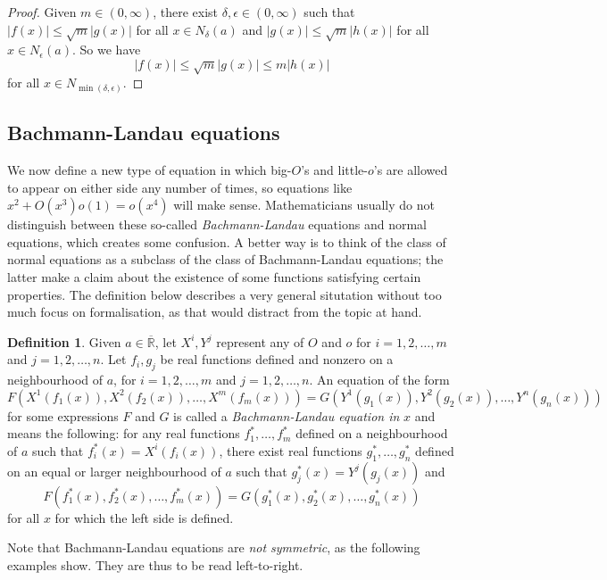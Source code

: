 \documentclass{article}
\theoremstyle{definition}
\newtheorem{definition}{Definition}
\newcommand\RRE{\overline{\mathbb R}}
\newcommand\abs[1]{\left\lvert#1\right\rvert}
\begin{document}
\begin{proof}
    Given \(m\in(0,\infty)\), there exist \(\delta,\epsilon\in(0,\infty)\) such that \(\abs{f(x)}\le\sqrt m \abs{g(x)}\) for all \(x\in N_{\delta}(a)\) and \(\abs{g(x)}\le\sqrt m \abs{h(x)}\) for all \(x\in N_{\epsilon}(a)\).
    So we have
    \[\abs{f(x)} \le \sqrt m \abs{g(x)} \le m \abs{h(x)}\]
    for all \(x\in N_{\min(\delta,\epsilon)}\).
\end{proof}

\subsection{Bachmann-Landau equations}\label{ssec:equations}

We now define a new type of equation in which big-$O$'s and little-$o$'s are allowed to appear on either side any number of times, so equations like $x^2 + O(x^3)o(1) = o(x^4)$ will make sense.
Mathematicians usually do not distinguish between these so-called \textit{Bachmann-Landau} equations and normal equations, which creates some confusion.
A better way is to think of the class of normal equations as a subclass of the class of Bachmann-Landau equations; the latter make a claim about the existence of some functions satisfying certain properties.
The definition below describes a very general situtation without too much focus on formalisation, as that would distract from the topic at hand.

\begin{definition}
    Given \(a\in\RRE\), let \(X^i, Y^j\) represent any of \(O\) and \(o\) for \(i=1,2,\ldots,m\) and \(j=1,2,\ldots,n\).
    Let \(f_i, g_j\) be real functions defined and nonzero on a neighbourhood of \(a\), for \(i=1,2,\ldots,m\) and \(j=1,2,\ldots,n\).
    An equation of the form
    \[F(X^1(f_1(x)), X^2(f_2(x)), \ldots, X^m(f_m(x))) = G(Y^1(g_1(x)), Y^2(g_2(x)), \ldots, Y^n(g_n(x)))\]
    for some expressions \(F\) and \(G\) is called a \textit{Bachmann-Landau equation in} \(x\) and means the following: for any real functions \(f_1^*, \ldots, f_m^*\) defined on a neighbourhood of \(a\) such that \(f_i^*(x) = X^i(f_i(x))\), there exist real functions \(g_1^*, \ldots, g_n^*\) defined on an equal or larger neighbourhood of \(a\) such that \(g_j^*(x) = Y^j(g_j(x))\) and
    \[F(f_1^*(x), f_2^*(x), \ldots, f_m^*(x)) = G(g_1^*(x), g_2^*(x), \ldots, g_n^*(x))\]
    for all \(x\) for which the left side is defined.
\end{definition}

Note that Bachmann-Landau equations are \textit{not symmetric}, as the following examples show.
They are thus to be read left-to-right.
\end{document}
